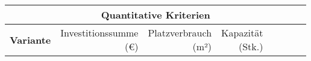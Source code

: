\newcommand{\naun}[1]{\textbf{\rotatebox{90}{\makecell[l]{#1}}}}

\renewcommand{\footnotesize}{\tiny}



\pagestyle{empty}

\begin{landscape}
    \begin{table}
        \centering
        \begin{tabular}{p{}rrrrrrr}
            \multicolumn{8}{c}{\textbf{Quantitative Kriterien}}                                                                                                                                                                                                                                                                                                                                                         \\
            \toprule
            \large\textbf{Variante}                            &
            \naun{Investitionssumme                                                                                                                                                                                                                                                                                                                                                                                     \\(\euro{})}             &
            \naun{Platzverbrauch                                                                                                                                                                                                                                                                                                                                                                                        \\(m²)}               &
            \naun{Kapazität                                                                                                                                                                                                                                                                                                                                                                                             \\(Stk.)}            &

\end{tabular}
\end{table}
\end{landscape}
